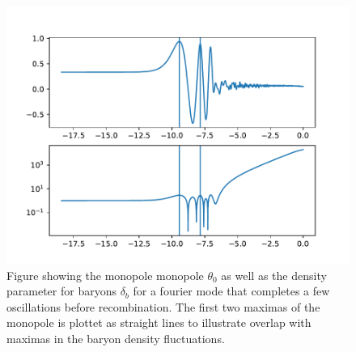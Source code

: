 \documentclass[onecolumn]{aastex62}
\begin{document}
\begin{figure}
    \includegraphics[scale=0.8]{figures/comparison0.pdf}
    \caption{Figure showing the monopole monopole $\theta_0$ as well as the density parameter for baryons $\delta_b$ for a fourier mode that completes a few oscillations before recombination. The first two maximas of the monopole is plottet as straight lines to illustrate overlap with maximas in the baryon density fluctuations.}
    \label{fig:comp0}
\end{figure}



\end{document}
